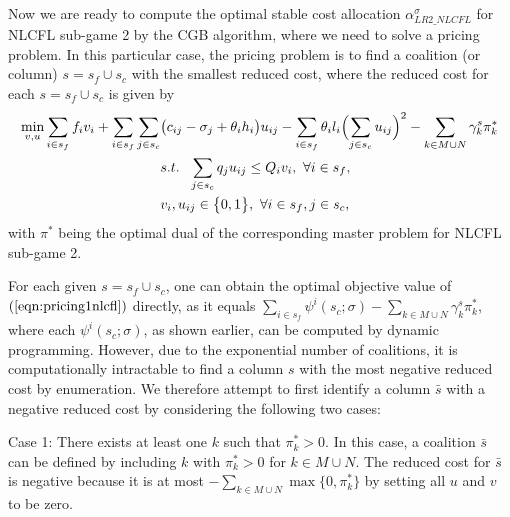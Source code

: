 \documentclass[ijoc,nonblindrev]{informs3} %
\begin{document}
Now we are ready to compute the optimal stable cost allocation $\alpha_{LR2\_NLCFL}^{\sigma}$ for NLCFL sub-game 2 by  the CGB algorithm, where we need to solve a pricing problem. In this particular case, the pricing problem is to find a coalition (or column) $s=s_f \cup s_c$ with the smallest reduced cost, where the reduced  cost for each $s = s_f \cup s_c$ is given by
\begin{eqnarray}\label{eqn:pricing1nlcfl}
\begin{aligned}
\begin{split}
\min_{v,u}  \sum_{i \in s_f} f_i v_i + \sum_{i \in s_f}\sum_{j \in s_c} &\big(c_{ij} - \sigma_j + \theta_ih_i\big)u_{ij} - \sum_{i \in s_f} \theta_il_i \Bigl( \sum_{j \in s_c}u_{ij}\Bigr)^2 - \sum_{k \in M \cup N} \gamma^s_k \pi_k^*\\ 
&s.t. ~~\sum_{j \in s_c}q_ju_{ij} \leq Q_iv_i, ~\forall i \in s_f,\\
&v_i, u_{ij} \in \big\{0,1\big\},~\forall i \in s_f, j \in s_c,
\end{split}
\end{aligned}
\end{eqnarray}
with $\pi^*$ being the optimal dual of the corresponding master problem for NLCFL sub-game 2. 


For each given $s=s_f\cup s_c$, one can obtain the optimal objective value of $(\ref{eqn:pricing1nlcfl})$ directly, as it equals $\sum_{i\in s_f}\psi^{i}(s_c;\sigma)-\sum_{k \in M \cup N} \gamma^s_k \pi_k^*$, where each $\psi^{i}(s_c;\sigma)$, as shown earlier, can be computed by dynamic programming. However, due to the exponential number of coalitions, it is computationally intractable to find a column $s$ with the most negative reduced cost by enumeration. We therefore attempt to first identify a column $\bar{s}$ with a negative reduced cost by considering the following two cases:

Case 1: There exists at least one $k$ such that $\pi^*_k>0$. In this case, a coalition $\bar s$ can be defined by including $k$ with $\pi^*_k>0$ for $k\in M \cup N$. The reduced cost for $\bar s$ is negative because it is at most $-\sum_{k\in M\cup N} \max\{0, \pi^*_k\}$ by setting all $u$ and $v$ to be zero.
\end{document}
